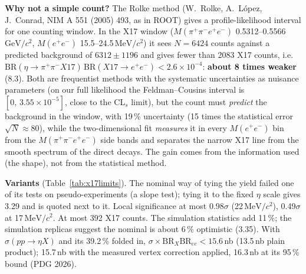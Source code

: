 \documentclass[11pt,a4paper]{article}
\makeatletter
\newcommand{\ee}{\ensuremath{e^{+}e^{-}}\xspace}
\newcommand{\pipi}{\ensuremath{\pi^{+}\pi^{-}}\xspace}
\newcommand{\Mfour}{\ensuremath{M(\pi^{+}\pi^{-}e^{+}e^{-})}\xspace}
\newcommand{\Mee}{\ensuremath{M(e^{+}e^{-})}\xspace}
\newcommand{\GeVcc}{\ensuremath{\mathrm{GeV}/c^{2}}\xspace}
\newcommand{\MeVcc}{\ensuremath{\mathrm{MeV}/c^{2}}\xspace}
\newcommand{\sigeta}{\ensuremath{\sigma(pp\to\eta X)}\xspace}
\newcommand{\BRX}{\ensuremath{\mathrm{BR}(\eta\to\pipi X17)\,\mathrm{BR}(X17\to\ee)}\xspace}
\newcommand{\floatbarrier}{\par\begingroup\let\@elt\relax\edef\@tempa{\@botlist\@deferlist\@dbldeferlist}\ifx\@tempa\@empty\else\clearpage\fi\endgroup}
\makeatother
\begin{document}
\textbf{Why not a simple count?} The Rolke method (W.~Rolke, A.~L\'opez, J.~Conrad, NIM A 551 (2005) 493, as in ROOT) gives a profile-likelihood
interval for one counting window. In the X17 window (\Mfour 0.5312--0.5566\,\GeVcc, \Mee 15.5--24.5\,\MeVcc) it sees $N=6424$ counts against a
predicted background of $6312\pm1196$ and gives fewer than 2083 X17 counts, i.e.\ $\BRX<2.6\times10^{-4}$: \textbf{about 8 times weaker} (8.3). Both are
frequentist methods with the systematic uncertainties as nuisance parameters (on our full likelihood the Feldman--Cousins interval is
$[0,\,3.55\times10^{-5}]$, close to the CL$_s$ limit), but the count must \emph{predict} the background in the window, with 19\,\% uncertainty (15
times the statistical error $\sqrt N\approx80$), while the two-dimensional fit \emph{measures} it in every \Mee bin from the \Mfour side bands and
separates the narrow X17 line from the smooth spectrum of the direct decays. The gain comes from the information used (the shape), not from the
statistical method.

\textbf{Variants} (Table~\ref{tab:x17limits}). The nominal way of tying the yield failed one of its tests on pseudo-experiments (a slope
test); tying it to the fixed $\eta$ scale gives 3.29 and is quoted next to it. Local significance at most $0.98\sigma$ (22\,\MeVcc),
0.49$\sigma$ at 17\,\MeVcc. At most 392 X17 counts. The simulation statistics add 11\,\%; the simulation replicas suggest the nominal is about
6\,\% optimistic (3.35). With \sigeta and its 39.2\,\% folded in, $\sigma\times\mathrm{BR}_X\mathrm{BR}_{ee}<15.6$\,nb (13.5\,nb plain product);
15.7\,nb with the measured vertex correction applied, 16.3\,nb at its 95\,\% bound (PDG 2026).





\floatbarrier
\end{document}
